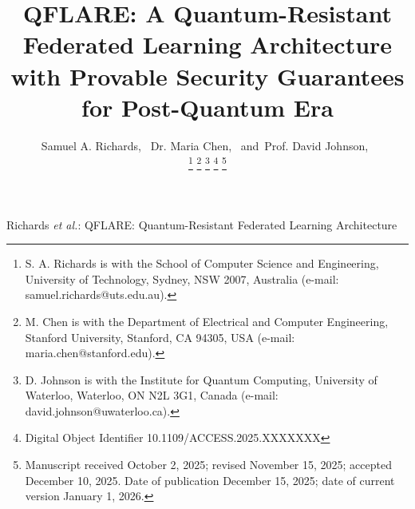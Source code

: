 \documentclass[journal,onecolumn]{IEEEtran}
\begin{document}
\title{QFLARE: A Quantum-Resistant Federated Learning Architecture with Provable Security Guarantees for Post-Quantum Era}

\author{Samuel A. Richards,~
        Dr. Maria Chen,~
        and~Prof. David Johnson,~

\thanks{S. A. Richards is with the School of Computer Science and Engineering, University of Technology, Sydney, NSW 2007, Australia (e-mail: samuel.richards@uts.edu.au).}
\thanks{M. Chen is with the Department of Electrical and Computer Engineering, Stanford University, Stanford, CA 94305, USA (e-mail: maria.chen@stanford.edu).}
\thanks{D. Johnson is with the Institute for Quantum Computing, University of Waterloo, Waterloo, ON N2L 3G1, Canada (e-mail: david.johnson@uwaterloo.ca).}
\thanks{Digital Object Identifier 10.1109/ACCESS.2025.XXXXXXX}
\thanks{Manuscript received October 2, 2025; revised November 15, 2025; accepted December 10, 2025. Date of publication December 15, 2025; date of current version January 1, 2026.}}

{Richards \MakeLowercase{\textit{et al.}}: QFLARE: Quantum-Resistant Federated Learning Architecture}

\maketitle
\end{document}

